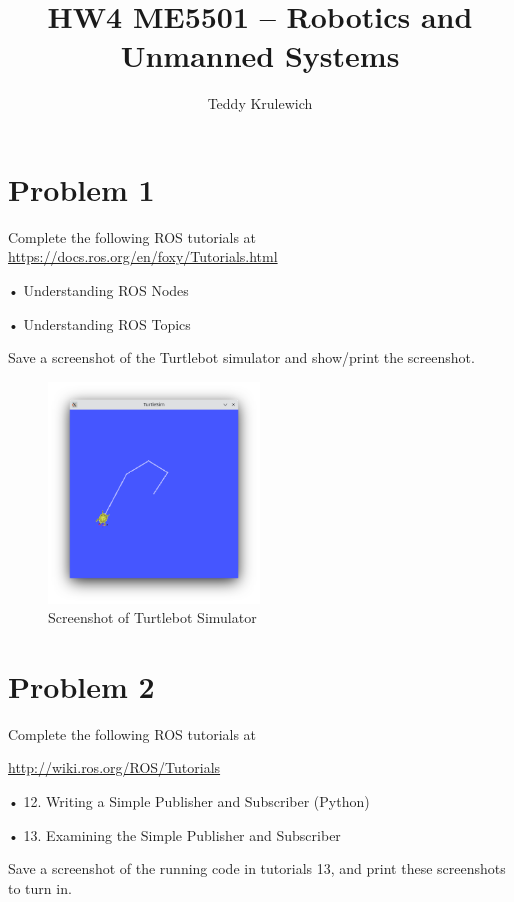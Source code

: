 \documentclass{article}
\author{Teddy Krulewich}
\title{\vspace{-4em}HW4 ME5501 – Robotics and Unmanned Systems}
\begin{document}
\maketitle

\section*{Problem 1}
Complete the following ROS tutorials at \url{https://docs.ros.org/en/foxy/Tutorials.html}

• Understanding ROS Nodes

• Understanding ROS Topics

\bigskip
\noindent Save a screenshot of the Turtlebot simulator and show/print the screenshot.


\begin{figure}[H]
    \centering
    \includegraphics[width=0.5\textwidth]{question1.png}
    \caption*{Screenshot of Turtlebot Simulator}
\end{figure}

\section*{Problem 2}

Complete the following ROS tutorials at

\url{http://wiki.ros.org/ROS/Tutorials}


• 12. Writing a Simple Publisher and Subscriber (Python) 


• 13. Examining the Simple Publisher and Subscriber 

\bigskip 
\noindent Save a screenshot of the running code in tutorials 13, and print these screenshots to turn in.
\end{document}
